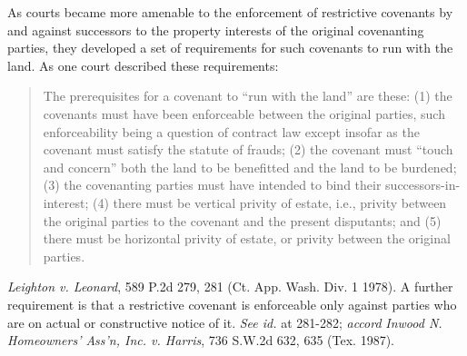 As courts became more amenable to the enforcement of restrictive covenants by
and against successors to the property interests of the original covenanting
parties, they developed a set of requirements for such covenants to run with the
land. As one court described these requirements:
\begin{quote}
The prerequisites for a covenant to ``run with the land'' are these: (1) the
covenants must have been enforceable between the original parties, such
enforceability being a question of contract law except insofar as the covenant
must satisfy the statute of frauds; (2) the covenant must ``touch and concern''
both the land to be benefitted and the land to be burdened; (3) the covenanting
parties must have intended to bind their successors-in-interest; (4) there must
be vertical privity of estate, i.e., privity between the original parties to the
covenant and the present disputants; and (5) there must be horizontal privity of
estate, or privity between the original parties.
\end{quote}
\emph{Leighton v. Leonard}, 589 P.2d 279, 281 (Ct. App. Wash. Div. 1 1978). A
further requirement is that a restrictive covenant is enforceable only against
parties who are on actual or constructive notice of it. \textit{See id.} at
281-282; \textit{accord} \emph{Inwood N. Homeowners' Ass'n, Inc. v. Harris}, 736
S.W.2d 632, 635 (Tex. 1987).

